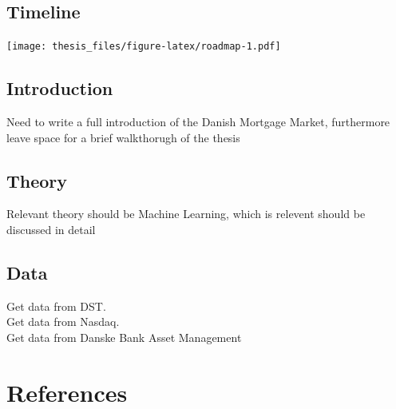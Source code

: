 \documentclass[12pt,twoside]{reedthesis}
\begin{document}
\hypertarget{timeline}{%
\section*{Timeline}\label{timeline}}

\texttt{[image: thesis\_files/figure-latex/roadmap-1.pdf]}

\hypertarget{introduction}{%
\section*{Introduction}\label{introduction}}

Need to write a full introduction of the Danish Mortgage Market, furthermore
leave space for a brief walkthorugh of the thesis

\hypertarget{theory-1}{%
\section*{Theory}\label{theory-1}}

Relevant theory should be Machine Learning, which is relevent should be discussed
in detail

\hypertarget{data-1}{%
\section*{Data}\label{data-1}}

Get data from DST.\\
Get data from Nasdaq.\\
Get data from Danske Bank Asset Management

\backmatter

\hypertarget{references}{%
\chapter*{References}\label{references}}


\noindent

\setlength{\parindent}{-0.20in}
\end{document}
